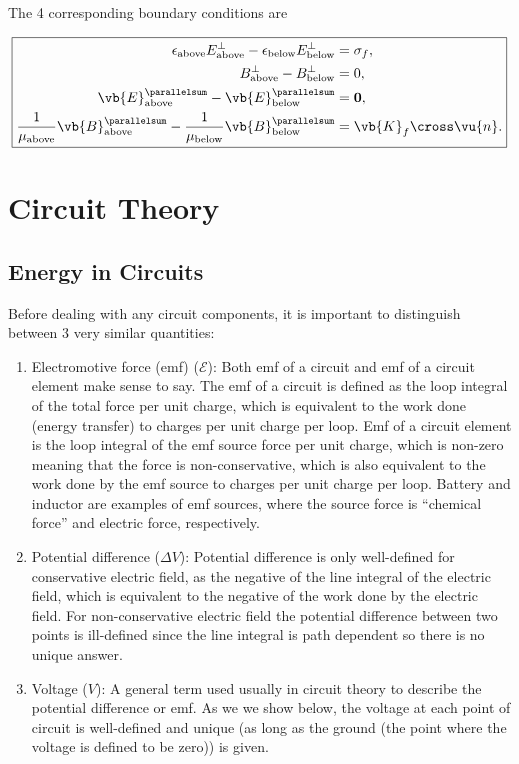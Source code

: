 \documentclass[english,a4paper,12pt]{report}
\begin{document}
The 4 corresponding boundary conditions are 

\begin{equation}
    \boxed{
    \begin{aligned}
        \epsilon _{\text{above} }E_{\text{above} }^{\perp } - \epsilon _{\text{below} }E_{\text{below} }^{\perp } &= \sigma _{f} ,\\
        B_{\text{above} }^{\perp } - B_{\text{below} }^{\perp } &=0,\\
        \vb{E} _{\text{above} }^{\parallelsum} - \vb{E} _{\text{below} }^{\parallelsum} &= \boldsymbol{0} ,\\
        \frac{1}{\mu _{\text{above} } }\vb{B} _{\text{above} }^{\parallelsum} - \frac{1}{\mu_{\text{below} } }\vb{B} _{\text{below} }^{\parallelsum} &=\vb{K} _{f}\cross \vu{n}  .                    
    \end{aligned}
    }
\end{equation}

\chapter{Circuit Theory}

\section{Energy in Circuits}

Before dealing with any circuit components, it is important to distinguish between 3 very similar quantities:

\begin{enumerate}
    \item Electromotive force (emf) (\(\mathcal{E}\)): Both emf of a circuit and emf of a circuit element make sense to say. The emf of a circuit is defined as the loop integral of the total force per unit charge, which is equivalent to the work done (energy transfer) to charges per unit charge per loop. Emf of a circuit element is the loop integral of the emf source force per unit charge, which is non-zero meaning that the force is non-conservative, which is also equivalent to the work done by the emf source to charges per unit charge per loop. Battery and inductor are examples of emf sources, where the source force is ``chemical force'' and electric force, respectively.
    \item Potential difference (\(\Delta V\)): Potential difference is only well-defined for conservative electric field, as the negative of the line integral of the electric field, which is equivalent to the negative of the work done by the electric field. For non-conservative electric field the potential difference between two points is ill-defined since the line integral is path dependent so there is no unique answer. 
    \item Voltage (\(V\)): A general term used usually in circuit theory to describe the potential difference or emf. As we we show below, the voltage at each point of circuit is well-defined and unique (as long as the ground (the point where the voltage is defined to be zero)) is given.
\end{enumerate}
\end{document}
